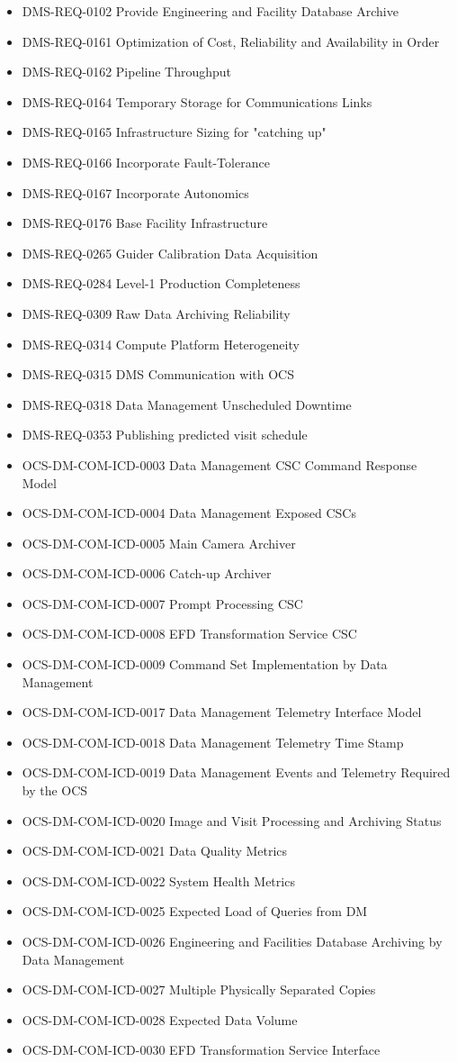\begin{itemize}
\item DMS-REQ-0102 Provide Engineering and Facility Database Archive
\item DMS-REQ-0161 Optimization of Cost, Reliability and Availability in Order
\item DMS-REQ-0162 Pipeline Throughput
\item DMS-REQ-0164 Temporary Storage for Communications Links
\item DMS-REQ-0165 Infrastructure Sizing for "catching up"
\item DMS-REQ-0166 Incorporate Fault-Tolerance
\item DMS-REQ-0167 Incorporate Autonomics
\item DMS-REQ-0176 Base Facility Infrastructure
\item DMS-REQ-0265 Guider Calibration Data Acquisition
\item DMS-REQ-0284 Level-1 Production Completeness
\item DMS-REQ-0309 Raw Data Archiving Reliability
\item DMS-REQ-0314 Compute Platform Heterogeneity
\item DMS-REQ-0315 DMS Communication with OCS
\item DMS-REQ-0318 Data Management Unscheduled Downtime
\item DMS-REQ-0353 Publishing predicted visit schedule
\item OCS-DM-COM-ICD-0003 Data Management CSC Command Response Model
\item OCS-DM-COM-ICD-0004 Data Management Exposed CSCs
\item OCS-DM-COM-ICD-0005 Main Camera Archiver
\item OCS-DM-COM-ICD-0006 Catch-up Archiver
\item OCS-DM-COM-ICD-0007 Prompt Processing CSC
\item OCS-DM-COM-ICD-0008 EFD Transformation Service CSC
\item OCS-DM-COM-ICD-0009 Command Set Implementation by Data Management
\item OCS-DM-COM-ICD-0017 Data Management Telemetry Interface Model
\item OCS-DM-COM-ICD-0018 Data Management Telemetry Time Stamp
\item OCS-DM-COM-ICD-0019 Data Management Events and Telemetry Required by the OCS
\item OCS-DM-COM-ICD-0020 Image and Visit Processing and Archiving Status
\item OCS-DM-COM-ICD-0021 Data Quality Metrics
\item OCS-DM-COM-ICD-0022 System Health Metrics
\item OCS-DM-COM-ICD-0025 Expected Load of Queries from DM
\item OCS-DM-COM-ICD-0026 Engineering and Facilities Database Archiving by Data Management
\item OCS-DM-COM-ICD-0027 Multiple Physically Separated Copies
\item OCS-DM-COM-ICD-0028 Expected Data Volume
\item OCS-DM-COM-ICD-0030 EFD Transformation Service Interface
\end{itemize}
